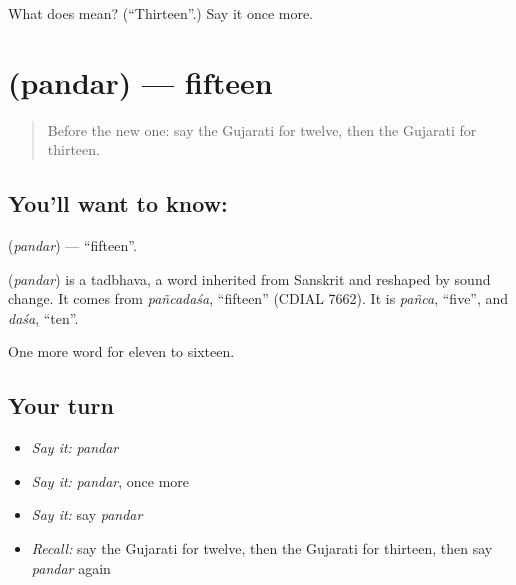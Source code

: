 \begin{tcolorbox}[breakable,colback=teal!4,colframe=teal!35!black,title={Before you move on}]
What does  mean? (\textquotedblleft{}Thirteen\textquotedblright{}.) Say it once more.
\end{tcolorbox}
\section[\texorpdfstring{\gu{પંદર} (pandar)}{પંદર (pandar)}]{ (pandar) — fifteen}

\label{lesson:GU-C81-fifteen}



\begin{quote}
Before the new one: say the Gujarati for twelve, then the Gujarati for thirteen.
\end{quote}

\subsection*{You'll want to know: }
\textbf{} (\emph{pandar}) — \textquotedblleft{}fifteen\textquotedblright{}.

\begin{cousinweb}
\textbf{} (\emph{pandar}) is a tadbhava, a word inherited from Sanskrit and reshaped by sound change. It comes from \emph{pañcadaśa}, \textquotedblleft{}fifteen\textquotedblright{} (CDIAL 7662). It is \emph{pañca}, \textquotedblleft{}five\textquotedblright{}, and \emph{daśa}, \textquotedblleft{}ten\textquotedblright{}.
\end{cousinweb}

\begin{grammarlens}[title={What you've built}]
One more word for eleven to sixteen.
\end{grammarlens}

\subsection*{Your turn}
\begin{itemize}
\raggedright
  \item \emph{Say it:} \emph{pandar}
  \item \emph{Say it:} \emph{pandar}, once more
  \item \emph{Say it:} say \emph{pandar}
  \item \emph{Recall:} say the Gujarati for twelve, then the Gujarati for thirteen, then say \emph{pandar} again
\end{itemize}

